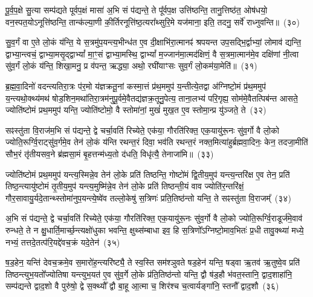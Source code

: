 पू॒र्व॒प॒क्षे सु॒त्या सम्प॑द्यते पूर्वप॒क्षं मासा॑ अ॒भि सं प॑द्यन्ते॒ ते पू᳚र्वप॒क्ष उत्ति॑ष्ठन्ति॒ तानु॒त्तिष्ठ॑त॒ ओष॑धयो॒ वन॒स्पत॒यो\-ऽनूत्ति॑ष्ठन्ति॒ तान्क॑ल्या॒णी की॒र्तिरनूत्ति॑ष्ठ॒त्यरा᳚थ्सुरि॒मे यज॑माना॒ इति॒ तदनु॒ सर्वे॑ राध्नुवन्ति॥~(३०)

{\anuvakamend[{ए॒तच्छ॒म्बट्कु॑र्वन्ति॒ तेषा॒ञ्चतु॑स्त्रिꣳशच्च}]}%

सु॒व॒र्गं वा ए॒ते लो॒कं य॑न्ति॒ ये स॒त्रमु॑प॒यन्त्य॒भीन्ध॑त ए॒व दी॒क्षाभि॑रा॒त्मानꣴ॑ श्रपयन्त उप॒सद्भि॒र्द्वाभ्यां॒ लोमाव॑ द्यन्ति॒ द्वाभ्या॒न्त्वचं॒ द्वाभ्या॒मसृ॒द्द्वाभ्यां᳚ मा॒ꣳ॒सं द्वाभ्या॒मस्थि॒ द्वाभ्यां᳚ म॒ज्जान॑मा॒त्मद॑क्षिणं॒ वै स॒त्रमा॒त्मान॑मे॒व दक्षि॑णां नी॒त्वा सु॑व॒र्गं लो॒कं य॑न्ति॒ शिखा॒मनु॒ प्र व॑पन्त॒ ऋद्ध्या॒ अथो॒ रघी॑याꣳसः सुव॒र्गं लो॒कम॑या॒मेति॑॥~(३१)

{\anuvakamend[{सु॒व॒र्गं प॑ञ्चा॒शत्}]}%

ब्र॒ह्म॒वा॒दिनो॑ वदन्त्यतिरा॒त्रः प॑र॒मो य॑ज्ञक्रतू॒नां कस्मा॒त्तं प्र॑थ॒ममुप॑ य॒न्तीत्ये॒तद्वा अ॑ग्निष्टो॒मं प्र॑थ॒ममुप॑ य॒न्त्यथो॒क्थ्य॑मथ॑ षोड॒शिन॒मथा॑तिरा॒त्रम॑नुपू॒र्वमे॒वैतद्य॑ज्ञक्र॒तूनु॒पेत्य॒ ताना॒लभ्य॑ परि॒गृह्य॒ सोम॑मे॒वैतत्पिब॑न्त आसते॒ ज्योति॑ष्टोमं प्रथ॒ममुप॑ यन्ति॒ ज्योति॑ष्टोमो॒ वै स्तोमा॑नां॒ मुखं॑ मुख॒त ए॒व स्तोमा॒न्प्र यु॑ञ्जते॒ ते~(३२)

सꣴस्तु॑ता वि॒राज॑म॒भि सं प॑द्यन्ते॒ द्वे चर्चा॒वति॑ रिच्येते॒ एक॑या॒ गौरति॑रिक्त॒ एक॒यायु॑रू॒नः सु॑व॒र्गो वै लो॒को ज्योति॒रूर्ग्वि॒राट्सु॑व॒र्गमे॒व तेन॑ लो॒कं य॑न्ति रथन्त॒रं दिवा॒ भव॑ति रथन्त॒रं नक्त॒मित्या॑हुर्ब्रह्मवा॒दिनः॒ केन॒ तदजा॒मीति॑ सौभ॒रं तृ॑तीयसव॒ने ब्र॑ह्मसा॒मं बृ॒हत्तन्म॑ध्य॒तो द॑धति॒ विधृ॑त्यै॒ तेनाजा॑मि॥~(३३)

{\anuvakamend[{त एका॒न्नप॑ञ्चा॒शच्च॑}]}%

ज्योति॑ष्टोमं प्रथ॒ममुप॑ यन्त्य॒स्मिन्ने॒व तेन॑ लो॒के प्रति॑ तिष्ठन्ति॒ गोष्टो॑मं द्वि॒तीय॒मुप॑ यन्त्य॒न्तरि॑क्ष ए॒व तेन॒ प्रति॑ तिष्ठ॒न्त्यायु॑ष्टोमं तृ॒तीय॒मुप॑ यन्त्य॒मुष्मि॑न्ने॒व तेन॑ लो॒के प्रति॑ तिष्ठन्ती॒यं वाव ज्योति॑र॒न्तरि॑क्षं॒ गौर॒सावायु॒र्यदे॒तान्थ्स्तोमा॑नुप॒यन्त्ये॒ष्वे॑व तल्लो॒केषु॑ स॒त्रिणः॑ प्रति॒तिष्ठ॑न्तो यन्ति॒ ते सꣴस्तु॑ता वि॒राजम्᳚~(३४)

अ॒भि सं प॑द्यन्ते॒ द्वे चर्चा॒वति॑ रिच्येते॒ एक॑या॒ गौरति॑रिक्त॒ एक॒यायु॑रू॒नः सु॑व॒र्गो वै लो॒को ज्योति॒रूर्ग्वि॒राडूर्ज॑मे॒वाव॑ रुन्धते॒ ते न क्षु॒धार्ति॒मार्च्छ॒न्त्यक्षो॑धुका भवन्ति॒ क्षुथ्स॑म्बाधा इव॒ हि स॒त्रिणो᳚\-ऽग्निष्टो॒माव॒भितः॑ प्र॒धी तावु॒क्थ्या॑ मध्ये॒ नभ्यं॒ तत्तदे॒तत्प॑रि॒यद्दे॑वच॒क्रं यदे॒तेन॑~(३५)

ष॒ड॒हेन॒ यन्ति॑ देवच॒क्रमे॒व स॒मारो॑ह॒न्त्यरि॑ष्ट्यै॒ ते स्व॒स्ति सम॑श्ञुवते षड॒हेन॑ यन्ति॒ षड्वा ऋ॒तव॑ ऋ॒तुष्वे॒व प्रति॑ तिष्ठन्त्युभ॒यतो᳚ज्योतिषा यन्त्युभ॒यत॑ ए॒व सु॑व॒र्गे लो॒के प्र॑ति॒तिष्ठ॑न्तो यन्ति॒ द्वौ ष॑ड॒हौ भ॑वत॒स्तानि॒ द्वाद॒शाहा॑नि॒ सम्प॑द्यन्ते द्वाद॒शो वै पुरु॑षो॒ द्वे स॒क्थ्यौ᳚ द्वौ बा॒हू आ॒त्मा च॒ शिर॑श्च च॒त्वार्यङ्गा॑नि॒ स्तनौ᳚ द्वाद॒शौ~(३६)


